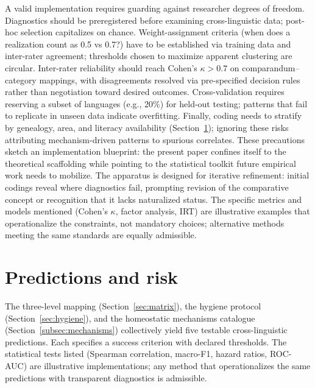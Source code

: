 \documentclass[12pt]{article}
\begin{document}
A valid implementation requires guarding against researcher degrees of freedom. Diagnostics should be preregistered before examining cross-linguistic data; post-hoc selection capitalizes on chance. Weight-assignment criteria (when does a realization count as 0.5 vs 0.7?) have to  be established via training data and inter-rater agreement; thresholds chosen to maximize apparent clustering are circular. Inter-rater reliability should reach Cohen's $\kappa > 0.7$ on comparandum--category mappings, with disagreements resolved via pre-specified decision rules rather than negotiation toward desired outcomes. Cross-validation requires reserving a subset of languages (e.g., 20\%) for held-out testing; patterns that fail to replicate in unseen data indicate overfitting. Finally, coding needs to stratify by genealogy, area, and literacy availability (Section~\ref{sec:predictions}); ignoring these risks attributing mechanism-driven patterns to spurious correlates. These precautions sketch an implementation blueprint: the present paper confines itself to the theoretical scaffolding while pointing to the statistical toolkit future empirical work needs to mobilize. The apparatus is designed for iterative refinement: initial codings reveal where diagnostics fail, prompting revision of the comparative concept or recognition that it lacks naturalized status. The specific metrics and models mentioned (Cohen's $\kappa$, factor analysis, IRT) are illustrative examples that operationalize the constraints, not mandatory choices; alternative methods meeting the same standards are equally admissible.

\section{Predictions and risk}\label{sec:predictions}
The three-level mapping (Section~\ref{sec:matrix}), the hygiene protocol (Section~\ref{sec:hygiene}), and the homeostatic mechanisms catalogue (Section~\ref{subsec:mechanisms}) collectively yield five testable cross-linguistic predictions. Each specifies a success criterion with declared thresholds. The statistical tests listed (Spearman correlation, macro-F1, hazard ratios, ROC-AUC) are illustrative implementations; any method that operationalizes the same predictions with transparent diagnostics is admissible.
\end{document}
